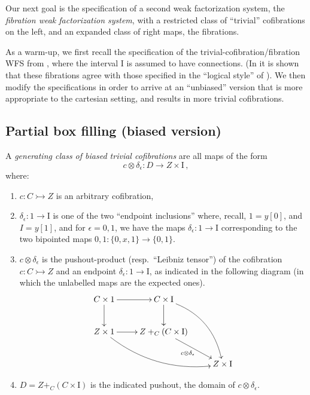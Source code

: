 \documentclass[12pt]{article}
\newcommand{\mono}{\ensuremath{\rightarrowtail}}
\newcommand{\ra}{\ensuremath{\rightarrow}}
\newcommand{\I}{\ensuremath{\mathrm{I}}}
\theoremstyle{remark}
\theoremstyle{definition}
\begin{document}
Our next goal is the specification of a second weak factorization system, the \emph{fibration weak factorization system}, with a restricted class of ``trivial'' cofibrations on the left, and an expanded class of right maps, the fibrations. 

As a warm-up, we first recall the specification of the trivial-cofibration/fibration WFS from \cite{GS}, where the interval $\I$ is assumed to have connections.  
(In \cite{AGH} it is shown that these fibrations agree with those specified in the ``logical style'' of \cite{CCHM,OP}).  We then modify the specifications in order to arrive at an ``unbiased'' version that is more appropriate to the cartesian setting, and results in more trivial cofibrations.

\subsection{Partial box filling (biased version)}\label{sec:biasedfibration}


A \emph{generating class of biased trivial cofibrations} are all maps of the form
\begin{equation}\label{eq:genclassTCof}
c \otimes \delta_\epsilon : D \ra Z\times \I\,,
\end{equation}
where:
\begin{enumerate}
\item  $c : C \mono Z$ is an arbitrary cofibration,

\item $\delta_\epsilon : 1 \ra \I$ is one of the two ``endpoint inclusions'' where, recall, $1 = y[0]$, and $I=y[1]$, and for $\epsilon = 0,1$, we have the maps $\delta_\epsilon : 1 \ra \I$ corresponding to the two bipointed maps $0,1 : \{0, x, 1\} \ra \{0,1\}$.

\item $c\otimes\delta_\epsilon$ is the pushout-product (resp.\ ``Leibniz tensor'') of the cofibration $c : C\mono Z$ and an endpoint $\delta_\epsilon:1 \ra \I$, as indicated in the following diagram (in which the unlabelled maps are the expected ones).
\begin{equation}\label{diagram:pushoutproduct}
\xymatrix{
C\times 1 \ar[d] \ar[r] & C\times \I \ar[d] \ar@/^4ex/ [rdd]\\
Z\times 1 \ar@/_4ex/ [rrd] \ar[r] &  Z +_C (C\times\I) \ar[rd]_{c \otimes \delta_\epsilon} \\
&& Z\times\I
}
\end{equation}

\item $D = Z +_C (C\times\I)$ is the indicated pushout, the domain of $c \otimes \delta_\epsilon$.
\end{enumerate}
\end{document}
